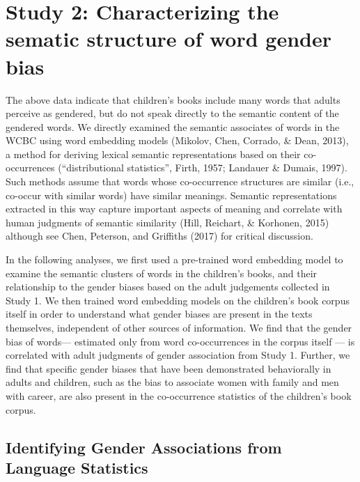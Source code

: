 \documentclass[english,,man,floatsintext]{apa6}
\begin{document}
\hypertarget{study-2-characterizing-the-sematic-structure-of-word-gender-bias}{%
\section{Study 2: Characterizing the sematic structure of word gender bias}\label{study-2-characterizing-the-sematic-structure-of-word-gender-bias}}

The above data indicate that children's books include many words that adults perceive as gendered, but do not speak directly to the semantic content of the gendered words. We directly examined the semantic associates of words in the WCBC using word embedding models (Mikolov, Chen, Corrado, \& Dean, 2013), a method for deriving lexical semantic representations based on their co-occurrences (``distributional statistics'', Firth, 1957; Landauer \& Dumais, 1997). Such methods assume that words whose co-occurrence structures are similar (i.e., co-occur with similar words) have similar meanings. Semantic representations extracted in this way capture important aspects of meaning and correlate with human judgments of semantic similarity (Hill, Reichart, \& Korhonen, 2015) although see Chen, Peterson, and Griffiths (2017) for critical discussion.

In the following analyses, we first used a pre-trained word embedding model to examine the semantic clusters of words in the children's books, and their relationship to the gender biases based on the adult judgements collected in Study 1. We then trained word embedding models on the children's book corpus itself in order to understand what gender biases are present in the texts themselves, independent of other sources of information. We find that the gender bias of words--- estimated only from word co-occurrences in the corpus itself --- is correlated with adult judgments of gender association from Study 1. Further, we find that specific gender biases that have been demonstrated behaviorally in adults and children, such as the bias to associate women with family and men with career, are also present in the co-occurrence statistics of the children's book corpus.

\hypertarget{identifying-gender-associations-from-language-statistics}{%
\subsection{Identifying Gender Associations from Language Statistics}\label{identifying-gender-associations-from-language-statistics}}
\end{document}
